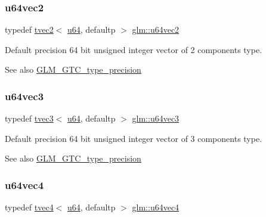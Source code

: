 \subsubsection{\texorpdfstring{u64vec2}{u64vec2}}
{\footnotesize\ttfamily typedef \hyperlink{structglm_1_1tvec2}{tvec2}$<$ \hyperlink{group__gtc__type__precision_ga71cedd4972f9cb1a5e14dfe5ab83ecd7}{u64}, defaultp $>$ \hyperlink{group__gtc__type__precision_gaddd85665767e5d32aee8516f00c45f59}{glm\+::u64vec2}}

Default precision 64 bit unsigned integer vector of 2 components type. \begin{DoxySeeAlso}{See also}
\hyperlink{group__gtc__type__precision}{G\+L\+M\+\_\+\+G\+T\+C\+\_\+type\+\_\+precision} 
\end{DoxySeeAlso}
\mbox{\label{group__gtc__type__precision_ga7f104c29d70170cfb2223b29f7985bd4}} 
\subsubsection{\texorpdfstring{u64vec3}{u64vec3}}
{\footnotesize\ttfamily typedef \hyperlink{structglm_1_1tvec3}{tvec3}$<$ \hyperlink{group__gtc__type__precision_ga71cedd4972f9cb1a5e14dfe5ab83ecd7}{u64}, defaultp $>$ \hyperlink{group__gtc__type__precision_ga7f104c29d70170cfb2223b29f7985bd4}{glm\+::u64vec3}}

Default precision 64 bit unsigned integer vector of 3 components type. \begin{DoxySeeAlso}{See also}
\hyperlink{group__gtc__type__precision}{G\+L\+M\+\_\+\+G\+T\+C\+\_\+type\+\_\+precision} 
\end{DoxySeeAlso}
\mbox{\label{group__gtc__type__precision_gadafdefd5524bf6a48bb7c47edb787ae5}} 
\subsubsection{\texorpdfstring{u64vec4}{u64vec4}}
{\footnotesize\ttfamily typedef \hyperlink{structglm_1_1tvec4}{tvec4}$<$ \hyperlink{group__gtc__type__precision_ga71cedd4972f9cb1a5e14dfe5ab83ecd7}{u64}, defaultp $>$ \hyperlink{group__gtc__type__precision_gadafdefd5524bf6a48bb7c47edb787ae5}{glm\+::u64vec4}}

